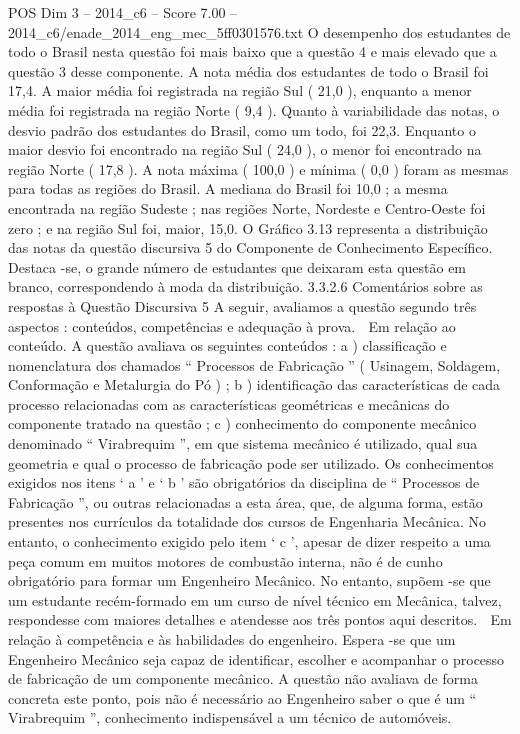 \begin{textsample}{POS Dim 3 – 2014\_c6 – Score 7.00 – 2014\_c6/enade\_2014\_eng\_mec\_5ff0301576.txt}
O desempenho dos estudantes de todo o Brasil nesta questão foi mais baixo que a questão 4 e mais elevado que a questão 3 desse componente.
A nota média dos estudantes de todo o Brasil foi 17,4.
A maior média foi registrada na região Sul ( 21,0 ), enquanto a menor média foi registrada na região Norte ( 9,4 ).
Quanto à variabilidade das notas, o desvio padrão dos estudantes do Brasil, como um todo, foi 22,3.
Enquanto o maior desvio foi encontrado na região Sul ( 24,0 ), o menor foi encontrado na região Norte ( 17,8 ).
A nota máxima ( 100,0 ) e mínima ( 0,0 ) foram as mesmas para todas as regiões do Brasil.
A mediana do Brasil foi 10,0 ; a mesma encontrada na região Sudeste ; nas regiões Norte, Nordeste e Centro-Oeste foi zero ; e na região Sul foi, maior, 15,0.
O Gráfico 3.13 representa a distribuição das notas da questão discursiva 5 do Componente de Conhecimento Específico.
Destaca -se, o grande número de estudantes que deixaram esta questão em branco, correspondendo à moda da distribuição. 3.3.2.6 Comentários sobre as respostas à Questão Discursiva 5 A seguir, avaliamos a questão segundo três aspectos : conteúdos, competências e adequação à prova.  Em relação ao conteúdo.
A questão avaliava os seguintes conteúdos : a ) classificação e nomenclatura dos chamados “ Processos de Fabricação ” ( Usinagem, Soldagem, Conformação e Metalurgia do Pó ) ; b ) identificação das características de cada processo relacionadas com as características geométricas e mecânicas do componente tratado na questão ; c ) conhecimento do componente mecânico denominado “ Virabrequim ”, em que sistema mecânico é utilizado, qual sua geometria e qual o processo de fabricação pode ser utilizado.
Os conhecimentos exigidos nos itens ‘ a ’ e ‘ b ’ são obrigatórios da disciplina de “ Processos de Fabricação ”, ou outras relacionadas a esta área, que, de alguma forma, estão presentes nos currículos da totalidade dos cursos de Engenharia Mecânica.
No entanto, o conhecimento exigido pelo item ‘ c ’, apesar de dizer respeito a uma peça comum em muitos motores de combustão interna, não é de cunho obrigatório para formar um Engenheiro Mecânico.
No entanto, supõem -se que um estudante recém-formado em um curso de nível técnico em Mecânica, talvez, respondesse com maiores detalhes e atendesse aos três pontos aqui descritos.  Em relação à competência e às habilidades do engenheiro.
Espera -se que um Engenheiro Mecânico seja capaz de identificar, escolher e acompanhar o processo de fabricação de um componente mecânico.
A questão não avaliava de forma concreta este ponto, pois não é necessário ao Engenheiro saber o que é um “ Virabrequim ”, conhecimento indispensável a um técnico de automóveis.

\end{textsample}
